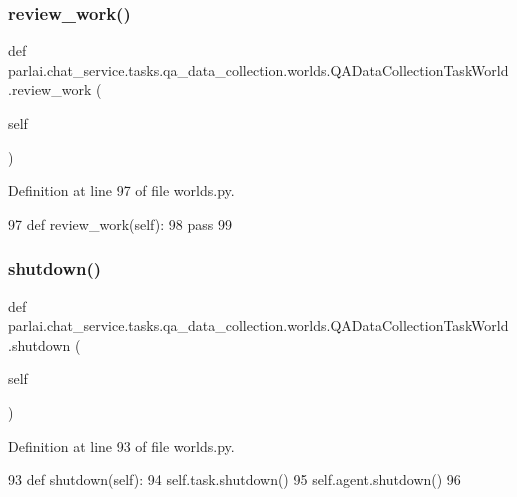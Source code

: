 \subsubsection{\texorpdfstring{review\+\_\+work()}{review\_work()}}
{\footnotesize\ttfamily def parlai.\+chat\+\_\+service.\+tasks.\+qa\+\_\+data\+\_\+collection.\+worlds.\+Q\+A\+Data\+Collection\+Task\+World.\+review\+\_\+work (\begin{DoxyParamCaption}\item[{}]{self }\end{DoxyParamCaption})}



Definition at line 97 of file worlds.\+py.


\begin{DoxyCode}
97     \textcolor{keyword}{def }review\_work(self):
98         \textcolor{keywordflow}{pass}
99 \end{DoxyCode}
\mbox{\label{classparlai_1_1chat__service_1_1tasks_1_1qa__data__collection_1_1worlds_1_1QADataCollectionTaskWorld_ac7f73536d3af94b755380148a9326a81}} 
\subsubsection{\texorpdfstring{shutdown()}{shutdown()}}
{\footnotesize\ttfamily def parlai.\+chat\+\_\+service.\+tasks.\+qa\+\_\+data\+\_\+collection.\+worlds.\+Q\+A\+Data\+Collection\+Task\+World.\+shutdown (\begin{DoxyParamCaption}\item[{}]{self }\end{DoxyParamCaption})}



Definition at line 93 of file worlds.\+py.


\begin{DoxyCode}
93     \textcolor{keyword}{def }shutdown(self):
94         self.task.shutdown()
95         self.agent.shutdown()
96 
\end{DoxyCode}


